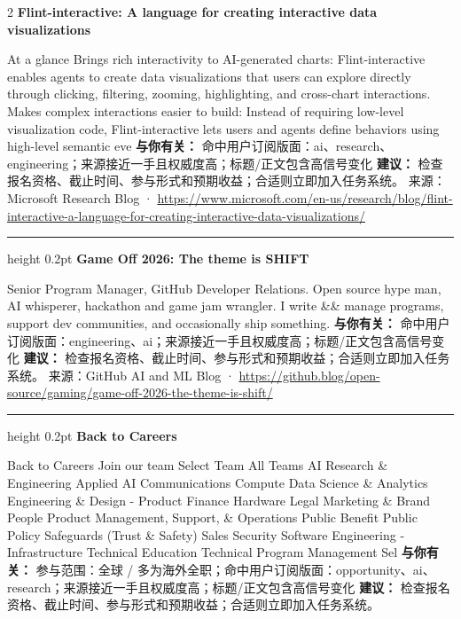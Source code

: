 \documentclass[10.5pt]{ctexart}
\begin{document}
\begin{multicols}{2}
{\large\bfseries Flint-interactive: A language for creating interactive data visualizations}\par
At a glance Brings rich interactivity to AI-generated charts: Flint-interactive enables agents to create data visualizations that users can explore directly through clicking, filtering, zooming, highlighting, and cross-chart interactions. Makes complex interactions easier to build: Instead of requiring low-level visualization code, Flint-interactive lets users and agents define behaviors using high-level semantic eve
\textbf{与你有关：} 命中用户订阅版面：ai、research、engineering；来源接近一手且权威度高；标题/正文包含高信号变化
\textbf{建议：} 检查报名资格、截止时间、参与形式和预期收益；合适则立即加入任务系统。
{\footnotesize\color{ormuted} 来源：Microsoft Research Blog · \url{https://www.microsoft.com/en-us/research/blog/flint-interactive-a-language-for-creating-interactive-data-visualizations/}}
\vspace{2mm}
\hrule height 0.2pt
\vspace{2mm}
{\large\bfseries Game Off 2026: The theme is SHIFT}\par
Senior Program Manager, GitHub Developer Relations. Open source hype man, AI whisperer, hackathon and game jam wrangler. I write \&\& manage programs, support dev communities, and occasionally ship something.
\textbf{与你有关：} 命中用户订阅版面：engineering、ai；来源接近一手且权威度高；标题/正文包含高信号变化
\textbf{建议：} 检查报名资格、截止时间、参与形式和预期收益；合适则立即加入任务系统。
{\footnotesize\color{ormuted} 来源：GitHub AI and ML Blog · \url{https://github.blog/open-source/gaming/game-off-2026-the-theme-is-shift/}}
\vspace{2mm}
\hrule height 0.2pt
\vspace{2mm}
{\large\bfseries Back to Careers}\par
Back to Careers Join our team Select Team All Teams AI Research \& Engineering Applied AI Communications Compute Data Science \& Analytics Engineering \& Design - Product Finance Hardware Legal Marketing \& Brand People Product Management, Support, \& Operations Public Benefit Public Policy Safeguards (Trust \& Safety) Sales Security Software Engineering - Infrastructure Technical Education Technical Program Management Sel
\textbf{与你有关：} 参与范围：全球 / 多为海外全职；命中用户订阅版面：opportunity、ai、research；来源接近一手且权威度高；标题/正文包含高信号变化
\textbf{建议：} 检查报名资格、截止时间、参与形式和预期收益；合适则立即加入任务系统。

\end{multicols}
\end{document}
